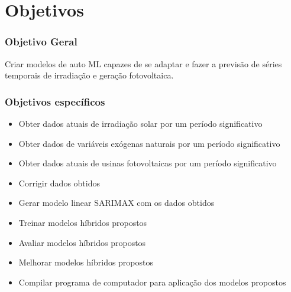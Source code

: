 \chapter{Objetivos}
\label{cap:objetivos}

\subsection{Objetivo Geral}

Criar modelos de auto ML capazes de se adaptar e fazer a previsão de séries temporais de irradiação e geração fotovoltaica.

\subsection{Objetivos específicos}

\begin{itemize}
    \item Obter dados atuais de irradiação solar por um período significativo
    \item Obter dados de variáveis exógenas naturais por um período significativo
    \item Obter dados atuais de usinas fotovoltaicas por um período significativo
    \item Corrigir dados obtidos
    \item Gerar modelo linear SARIMAX com os dados obtidos
    \item Treinar modelos híbridos propostos
    \item Avaliar modelos híbridos propostos
    \item Melhorar modelos híbridos propostos
    \item Compilar programa de computador para aplicação dos modelos propostos
\end{itemize}